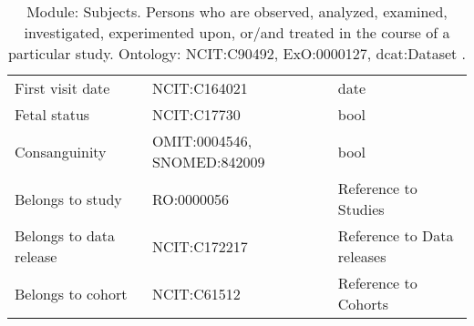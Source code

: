 \documentclass{article}
\begin{document}
\begin{table}[htb]
\begin{tabular}{lll}
First visit date & NCIT:C164021  & date \\
Fetal status & NCIT:C17730  & bool \\
Consanguinity & OMIT:0004546, SNOMED:842009  & bool \\
Belongs to study & RO:0000056  & Reference to Studies \\
Belongs to data release & NCIT:C172217  & Reference to Data releases \\
Belongs to cohort & NCIT:C61512  & Reference to Cohorts \\
\hline
\end{tabular}
\caption[Module: Subjects]{\label{table:table4} Module: Subjects. Persons who are observed, analyzed, examined, investigated, experimented upon, or/and treated in the course of a particular study. Ontology: NCIT:C90492, ExO:0000127, dcat:Dataset . }
\end{table}
\end{document}
